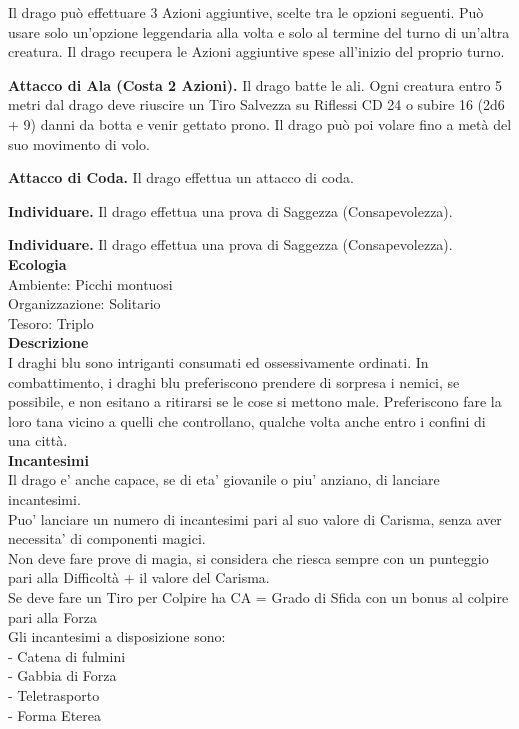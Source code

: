 \begin{multicols}{2}
Il drago può effettuare 3 Azioni aggiuntive, scelte tra le opzioni seguenti. Può usare solo un'opzione leggendaria alla volta e solo al termine del turno di un'altra creatura. Il drago recupera le Azioni aggiuntive spese all'inizio del proprio turno.

\textbf{Attacco di Ala (Costa 2 Azioni).} Il drago batte le ali. Ogni creatura entro 5 metri dal drago deve riuscire un Tiro Salvezza su Riflessi CD 24 o subire 16 (2d6 + 9) danni da botta e venir gettato prono. Il drago può poi volare fino a metà del suo movimento di volo.

\textbf{Attacco di Coda.} Il drago effettua un attacco di coda.

\textbf{Individuare.} Il drago effettua una prova di Saggezza (Consapevolezza).

\textbf{Individuare.} Il drago effettua una prova di Saggezza (Consapevolezza).\\
\textbf{Ecologia}\\
Ambiente: Picchi montuosi\\
Organizzazione: Solitario\\
Tesoro: Triplo\\
\textbf{Descrizione}\\
I draghi blu sono intriganti consumati ed ossessivamente ordinati. In combattimento, i draghi blu preferiscono prendere di sorpresa i nemici, se possibile, e non esitano a ritirarsi se le cose si mettono male. Preferiscono fare la loro tana vicino a quelli che controllano, qualche volta anche entro i confini di una città.\\
\textbf{Incantesimi}\\
Il drago e' anche capace, se di eta' giovanile o piu' anziano, di lanciare incantesimi.\\
Puo' lanciare un numero di incantesimi pari al suo valore di Carisma, senza aver necessita' di componenti magici.\\
Non deve fare prove di magia, si considera che riesca sempre con un punteggio pari alla Difficoltà + il valore del Carisma.\\
Se deve fare un Tiro per Colpire ha CA = Grado di Sfida con un bonus al colpire pari alla Forza\\
Gli incantesimi a disposizione sono:\\
- Catena di fulmini\\
- Gabbia di Forza\\
- Teletrasporto\\
- Forma Eterea\\



\end{multicols}
